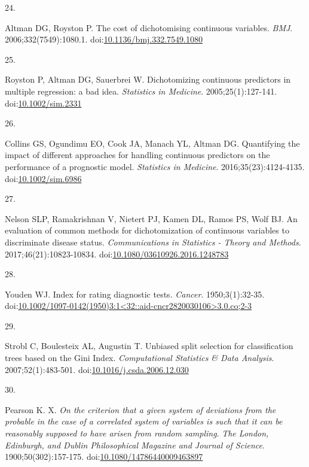 \documentclass[
]{book}
\newlength{\cslhangindent}
\newlength{\csllabelwidth}
\newlength{\cslentryspacingunit} %
\newenvironment{CSLReferences}[2] %
 {%
  \setlength{\parindent}{0pt}
  \ifodd #1
  \let\oldpar\par
  \def\par{\hangindent=\cslhangindent\oldpar}
  \fi
  \setlength{\parskip}{#2\cslentryspacingunit}
 }%
 {}
\newcommand{\CSLLeftMargin}[1]{\parbox[t]{\csllabelwidth}{#1}}
\newcommand{\CSLRightInline}[1]{\parbox[t]{\linewidth - \csllabelwidth}{#1}\break}
\begin{document}
\begin{CSLReferences}{0}{0}
\leavevmode{}%
\CSLLeftMargin{24. }%
\CSLRightInline{Altman DG, Royston P. The cost of dichotomising continuous variables. \emph{BMJ}. 2006;332(7549):1080.1. doi:\href{https://doi.org/10.1136/bmj.332.7549.1080}{10.1136/bmj.332.7549.1080}}

\leavevmode{}%
\CSLLeftMargin{25. }%
\CSLRightInline{Royston P, Altman DG, Sauerbrei W. Dichotomizing continuous predictors in multiple regression: a bad idea. \emph{Statistics in Medicine}. 2005;25(1):127-141. doi:\href{https://doi.org/10.1002/sim.2331}{10.1002/sim.2331}}

\leavevmode{}%
\CSLLeftMargin{26. }%
\CSLRightInline{Collins GS, Ogundimu EO, Cook JA, Manach YL, Altman DG. Quantifying the impact of different approaches for handling continuous predictors on the performance of a prognostic model. \emph{Statistics in Medicine}. 2016;35(23):4124-4135. doi:\href{https://doi.org/10.1002/sim.6986}{10.1002/sim.6986}}

\leavevmode{}%
\CSLLeftMargin{27. }%
\CSLRightInline{Nelson SLP, Ramakrishnan V, Nietert PJ, Kamen DL, Ramos PS, Wolf BJ. An evaluation of common methods for dichotomization of continuous variables to discriminate disease status. \emph{Communications in Statistics - Theory and Methods}. 2017;46(21):10823-10834. doi:\href{https://doi.org/10.1080/03610926.2016.1248783}{10.1080/03610926.2016.1248783}}

\leavevmode{}%
\CSLLeftMargin{28. }%
\CSLRightInline{Youden WJ. Index for rating diagnostic tests. \emph{Cancer}. 1950;3(1):32-35. doi:\href{https://doi.org/10.1002/1097-0142(1950)3:1\%3C32::aid-cncr2820030106\%3E3.0.co;2-3}{10.1002/1097-0142(1950)3:1\textless32::aid-cncr2820030106\textgreater3.0.co;2-3}}

\leavevmode{}%
\CSLLeftMargin{29. }%
\CSLRightInline{Strobl C, Boulesteix AL, Augustin T. Unbiased split selection for classification trees based on the Gini Index. \emph{Computational Statistics \& Data Analysis}. 2007;52(1):483-501. doi:\href{https://doi.org/10.1016/j.csda.2006.12.030}{10.1016/j.csda.2006.12.030}}

\leavevmode{}%
\CSLLeftMargin{30. }%
\CSLRightInline{Pearson K. X. {\emph{On the criterion that a given system of deviations from the probable in the case of a correlated system of variables is such that it can be reasonably supposed to have arisen from random sampling}}. \emph{The London, Edinburgh, and Dublin Philosophical Magazine and Journal of Science}. 1900;50(302):157-175. doi:\href{https://doi.org/10.1080/14786440009463897}{10.1080/14786440009463897}}


\end{CSLReferences}
\end{document}
